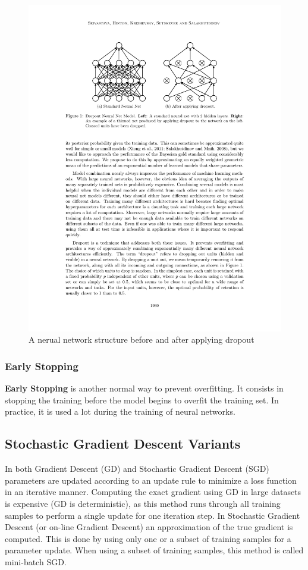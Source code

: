     \begin{figure}[!h]
        \centering
        \includegraphics[scale=0.7]{Figures/dropout.pdf}
        \caption{A nerual network structure before and after applying dropout}
        \label{dropout}
    \end{figure}

    \subsubsection{Early Stopping}
    \textbf{Early Stopping} is another normal way to prevent overfitting. 
    It consists in stopping the training before the model begins to overfit the training set.  In practice, it is used a lot during the training of neural networks.


    \subsection{Stochastic Gradient Descent Variants}
    \label{sgd}
    In both Gradient Descent (GD) and Stochastic Gradient Descent (SGD) parameters are updated according to an update rule to minimize a loss function in an iterative manner. Computing the exact gradient using GD in large datasets is expensive (GD is deterministic), as this method runs through all training samples to perform a single update for one iteration step. In Stochastic Gradient Descent (or on-line Gradient Descent) an approximation of the true gradient is computed. This is done by using only one or a subset of training samples for a parameter update. When using a subset of training samples, this method is called mini-batch SGD. \\


